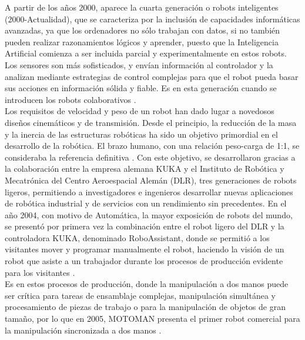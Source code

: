 A partir de los años 2000, aparece la cuarta generación o robots inteligentes (2000-Actualidad), que se caracteriza por la inclusión de capacidades informáticas avanzadas, ya que los ordenadores no sólo trabajan con datos, si no también pueden realizar razonamientos lógicos y aprender, puesto que la Inteligencia Artificial comienza a ser incluida parcial y experimentalmente en estos robots. Los sensores son más sofisticados, y envían información al controlador y la analizan mediante estrategias de control complejas para que el robot pueda basar sus acciones en información sólida y fiable. Es en esta generación cuando se introducen los robots colaborativos \cite{Zamalloa17}.\\
  
Los requisitos de velocidad y peso de un robot han dado lugar a novedosos diseños cinemáticos y de transmisión. Desde el principio, la reducción de la masa y la inercia de las estructuras robóticas ha sido un objetivo primordial en el desarrollo de la robótica. El brazo humano, con una relación peso-carga de 1:1, se consideraba la referencia definitiva \cite{Siciliano16}. Con este objetivo, se desarrollaron gracias a la colaboración entre la empresa alemana KUKA y el Instituto de Robótica y Mecatrónica del Centro Aeroespacial Alemán (DLR), tres generaciones de robots ligeros, permitiendo a investigadores e ingenieros desarrollar nuevas aplicaciones de robótica industrial y de servicios con un rendimiento sin precedentes. En el año 2004, con motivo de Automática, la mayor exposición de robots del mundo, se presentó por primera vez la combinación entre el robot ligero del DLR y la controladora KUKA, denominado RoboAssistant, donde se permitió a los visitantes mover y programar manualmente el robot, haciendo la visión de un robot que asiste a un trabajador durante los procesos de producción evidente para los visitantes \cite{Bischoff10}. \\
  
  
Es en estos procesos de producción, donde la manipulación a dos manos puede ser crítica para tareas de ensamblaje complejas, manipulación simultánea
y procesamiento de piezas de trabajo o para la manipulación de objetos de gran tamaño, por lo que en 2005, MOTOMAN presenta el primer robot comercial para la manipulación sincronizada a dos manos \cite{Siciliano16}.\\

